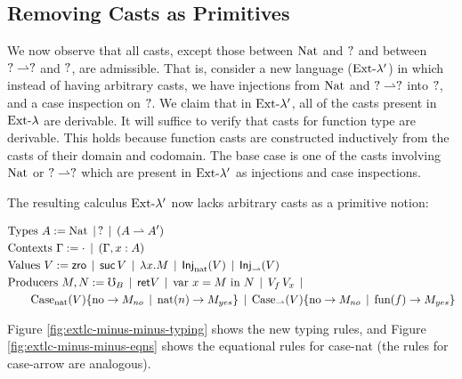\subsection{Removing Casts as Primitives}


We now observe that all casts, except those between $\text{Nat}$ and $?$
and between $? \rightharpoonup ?$ and $?$, are admissible.
That is, consider a new language ($\text{Ext-}\lambda'$) in which
instead of having arbitrary casts, we have injections from $\text{Nat}$ and
$? \rightharpoonup ?$ into $?$, and a case inspection on $?$.
We claim that in $\text{Ext-}\lambda'$, all of the casts present in $\text{Ext-}\lambda$ are derivable.
It will suffice to verify that casts for function type are derivable.
This holds because function casts are constructed inductively from the casts
of their domain and codomain. The base case is one of the casts involving $\text{Nat}$
or $? \rightharpoonup ?$ which are present in $\text{Ext-}\lambda'$ as injections and case inspections.


The resulting calculus $\text{Ext-}\lambda'$ now lacks arbitrary casts as a primitive notion:


\begin{align*}
  &\text{Types } A := \text{Nat} \mathrel{\bf \,\mid\,} ? \mathrel{\bf \,\mid\,} (A \rightharpoonup A') \\
  &\text{Contexts } \Gamma := \cdot \mathrel{\bf \,\mid\,} (\Gamma, x : A) \\
  &\text{Values } V :=  \textsf{zro} \mathrel{\bf \,\mid\,} \textsf{suc}\, V \mathrel{\bf \,\mid\,} \lambda {x} . {M} \mathrel{\bf \,\mid\,} \textsf{Inj}_\text{nat} ({V}) \mathrel{\bf \,\mid\,} \textsf{Inj}_\rightharpoonup ({V}) \\ 
  &\text{Producers } M, N := \mho_B \mathrel{\bf \,\mid\,} \mathsf{ret} {V} \mathrel{\bf \,\mid\,} \text{var } {x} = {M} \text{ in } {N}
    \mathrel{\bf \,\mid\,} V_f\, V_x \mathrel{\bf \,\mid\,}
    \\ & \quad\quad \text{Case}_\text{nat} ({V}) \{ \text{no} \to {M_{no}} \mathrel{\bf \,\mid\,} \text{nat}({n}) \to {M_{yes}} \} 
    \mathrel{\bf \,\mid\,} \text{Case}_\rightharpoonup ({V}) \{ \text{no} \to {M_{no}} \mathrel{\bf \,\mid\,} \text{fun}({f}) \to {M_{yes}} \}
\end{align*}


Figure \ref{fig:extlc-minus-minus-typing} shows the new typing rules,
and Figure \ref{fig:extlc-minus-minus-eqns} shows the equational rules
for case-nat (the rules for case-arrow are analogous).


